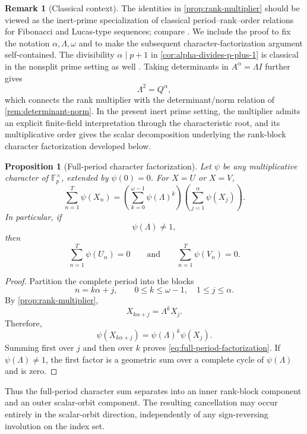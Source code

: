 \documentclass[11pt]{article}
\newcommand{\Fp}{\mathbb{F}_p}
\theoremstyle{plain}
\newtheorem{proposition}[theorem]{Proposition}
\theoremstyle{definition}
\newtheorem{remark}[theorem]{Remark}
\begin{document}
\begin{remark}[Classical context]
\label{rem:classical-context}
The identities in \cref{prop:rank-multiplier} should be viewed as the inert-prime
specialization of classical period--rank--order relations for Fibonacci and
Lucas-type sequences; compare
\cite{Wall1960,Robinson1963,Vinson1963,Somer1980,Renault1996,Renault2013,FiebigMbirikaSpilker2025}.
We include the proof to fix the notation $\alpha,\Lambda,\omega$ and to make the
subsequent character-factorization argument self-contained. The divisibility
$\alpha\mid p+1$ in \cref{cor:alpha-divides-p-plus-1} is classical in the nonsplit
prime setting as well \cite{Lucas1878,Wall1960,GuptaRockstrohSu2012}.
Taking determinants in $A^\alpha=\Lambda I$ further gives
\[
\Lambda^2=Q^\alpha,
\]
which connects the rank multiplier with the determinant/norm relation of
\cref{rem:determinant-norm}.
In the present inert prime setting, the multiplier admits an explicit
finite-field interpretation through the characteristic root, and its
multiplicative order gives the scalar decomposition underlying the rank-block
character factorization developed below.
\end{remark}

\begin{proposition}[Full-period character factorization]
\label{prop:full-period-factorization}
Let $\psi$ be any multiplicative character of $\Fp^\times$, extended by $\psi(0)=0$. For $X=U$ or $X=V$,
\begin{equation}
 \sum_{n=1}^{T}\psi(X_n)
 =
 \left(\sum_{k=0}^{\omega-1}\psi(\Lambda)^k\right)
 \left(\sum_{j=1}^{\alpha}\psi(X_j)\right).
 \label{eq:full-period-factorization}
\end{equation}
In particular, if
\[
 \psi(\Lambda)\neq1,
\]
then
\[
 \sum_{n=1}^{T}\psi(U_n)=0
 \qquad\text{and}\qquad
 \sum_{n=1}^{T}\psi(V_n)=0.
\]
\end{proposition}

\begin{proof}
Partition the complete period into the blocks
\[
 n=k\alpha+j,
 \qquad
 0\leq k\leq\omega-1,\quad 1\leq j\leq\alpha.
\]
By \cref{prop:rank-multiplier},
\[
 X_{k\alpha+j}=\Lambda^kX_j.
\]
Therefore,
\[
 \psi(X_{k\alpha+j})
 =\psi(\Lambda)^k\psi(X_j).
\]
Summing first over $j$ and then over $k$ proves \eqref{eq:full-period-factorization}. If $\psi(\Lambda)\neq1$, the first factor is a geometric sum over a complete cycle of $\psi(\Lambda)$ and is zero.
\end{proof}

Thus the full-period character sum separates into an inner rank-block component and an outer scalar-orbit component. The resulting cancellation may occur entirely in the scalar-orbit direction, independently of any sign-reversing involution on the index set.
\end{document}
